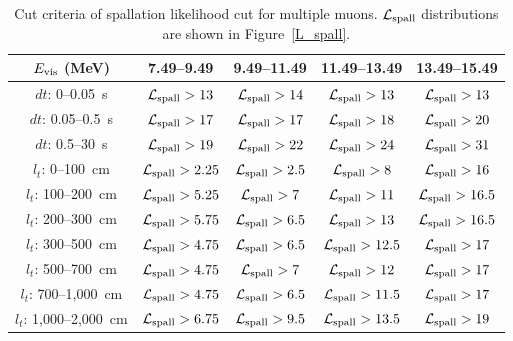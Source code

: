 \begin{table}[p]
	\centering
	\caption[Cut criteria of spallation likelihood cut for multiple muons]{
	Cut criteria of spallation likelihood cut for multiple muons.
	$\mathcal{L}_{\rm spall}$ distributions are shown in Figure~\ref{L_spall}.
	}\label{tab:cut_multiple}
	\vs
	\begin{tabular}{ccccc} \hline \hline
		$E_{\rm vis}$ (MeV)      & 7.49--9.49                       & 9.49--11.49                     & 11.49--13.49                     & 13.49--15.49                     \\ \hline
		$dt$: 0--0.05~s          & $\mathcal{L}_{\rm spall} > 13$   & $\mathcal{L}_{\rm spall} > 14$  & $\mathcal{L}_{\rm spall} > 13$   & $\mathcal{L}_{\rm spall} > 13$   \\
		$dt$: 0.05--0.5~s        & $\mathcal{L}_{\rm spall} > 17$   & $\mathcal{L}_{\rm spall} > 17$  & $\mathcal{L}_{\rm spall} > 18$   & $\mathcal{L}_{\rm spall} > 20$   \\
		$dt$: 0.5--30~s          & $\mathcal{L}_{\rm spall} > 19$   & $\mathcal{L}_{\rm spall} > 22$  & $\mathcal{L}_{\rm spall} > 24$   & $\mathcal{L}_{\rm spall} > 31$   \\
		$l_{t}$: 0--100~cm       & $\mathcal{L}_{\rm spall} > 2.25$ & $\mathcal{L}_{\rm spall} > 2.5$ & $\mathcal{L}_{\rm spall} > 8$    & $\mathcal{L}_{\rm spall} > 16$   \\
		$l_{t}$: 100--200~cm     & $\mathcal{L}_{\rm spall} > 5.25$ & $\mathcal{L}_{\rm spall} > 7$   & $\mathcal{L}_{\rm spall} > 11$   & $\mathcal{L}_{\rm spall} > 16.5$ \\
		$l_{t}$: 200--300~cm     & $\mathcal{L}_{\rm spall} > 5.75$ & $\mathcal{L}_{\rm spall} > 6.5$ & $\mathcal{L}_{\rm spall} > 13$   & $\mathcal{L}_{\rm spall} > 16.5$ \\
		$l_{t}$: 300--500~cm     & $\mathcal{L}_{\rm spall} > 4.75$ & $\mathcal{L}_{\rm spall} > 6.5$ & $\mathcal{L}_{\rm spall} > 12.5$ & $\mathcal{L}_{\rm spall} > 17$   \\
		$l_{t}$: 500--700~cm     & $\mathcal{L}_{\rm spall} > 4.75$ & $\mathcal{L}_{\rm spall} > 7$   & $\mathcal{L}_{\rm spall} > 12$   & $\mathcal{L}_{\rm spall} > 17$   \\
		$l_{t}$: 700--1,000~cm   & $\mathcal{L}_{\rm spall} > 4.75$ & $\mathcal{L}_{\rm spall} > 6.5$ & $\mathcal{L}_{\rm spall} > 11.5$ & $\mathcal{L}_{\rm spall} > 17$   \\
		$l_{t}$: 1,000--2,000~cm & $\mathcal{L}_{\rm spall} > 6.75$ & $\mathcal{L}_{\rm spall} > 9.5$ & $\mathcal{L}_{\rm spall} > 13.5$ & $\mathcal{L}_{\rm spall} > 19$   \\ \hline \hline

\end{tabular}
\end{table}
